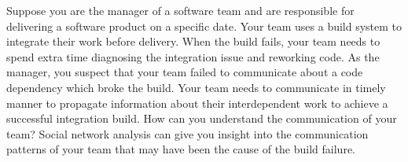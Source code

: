 \documentclass[12pt,oneside]{book}
\begin{document}



\newpage
















Suppose you are the manager of a software team and are responsible for delivering
a software product on a specific date. Your team uses a build system to integrate
their work before delivery. When the build fails, your team needs to spend extra
time diagnosing the integration issue and reworking code. As the manager, you
suspect that your team failed to communicate about a code dependency which broke
the build. Your team needs to communicate in timely manner to propagate
information about their interdependent work to achieve a successful integration
build. How can you understand the communication of your team? Social network
analysis can give you insight into the communication patterns of your team that
may have been the cause of the build failure.
\end{document}
